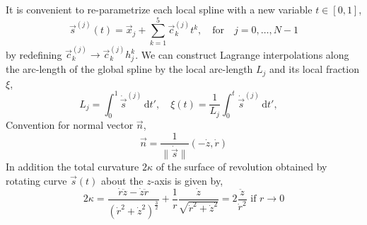 \documentclass{jfm}
\begin{document}
\par It is convenient to re-parametrize each local spline with a new variable $t\in[0,1]$,
\begin{equation}
\vec{s}^{(j)}(t)=\vec{x}_j+\sum_{k=1}^{5}\vec{c}^{(j)}_k  t ^k,
\quad\textrm{for}\quad j=0,\dots,N-1
\end{equation}
by redefining $\vec{c}^{(j)}_k\to \vec{c}^{(j)}_kh_j^k$.
We can construct Lagrange interpolations along the arc-length of the global spline
by the local arc-length $L_j$ and its local fraction $\xi$,
\begin{equation}
L_j = \int_{0}^1\dot{\vec{s}}^{(j)}\,\mathrm{d}t',\quad
\xi(t) =\frac{1}{L_j} \int_{0}^t\dot{\vec{s}}^{(j)}\,\mathrm{d}t',\quad
\end{equation}
Convention for normal vector $\vec{n}$,
\begin{equation}
\vec{n}=\frac{1}{\|\dot{\vec{s}}\|}(-\dot{z},\dot{r})
\end{equation}
In addition the total curvature $2\kappa$ of the surface of revolution obtained by rotating curve $\vec{s}(t)$
about the $z$-axis is given by,
\begin{equation}
2\kappa= \frac{\dot{r}\ddot{z} - \dot{z}\ddot{r}}{(\dot{r}^2+\dot{z}^2)^{\frac{3}{2}}}
+\frac{1}{r}\frac{\dot{z}}{\sqrt{\dot{r}^2+\dot{z}^2}}
=2\frac{\ddot{z}}{\dot{r}^2} \textrm{ if } r\to 0
\end{equation}
\end{document}
